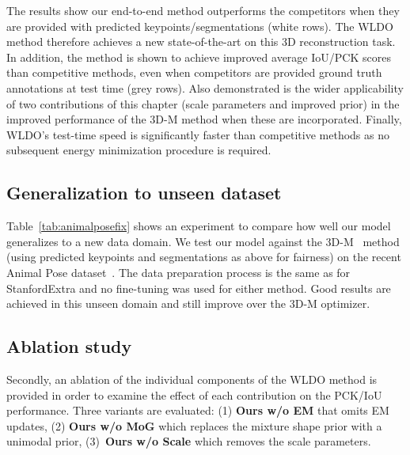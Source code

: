The results show our end-to-end method outperforms the competitors when they are provided with predicted keypoints/segmentations (white rows). The WLDO method therefore achieves a new state-of-the-art on this 3D reconstruction task. In addition, the method is shown to achieve improved average IoU/PCK scores than competitive methods, even when competitors are provided ground truth annotations at test time (grey rows). Also demonstrated is the wider applicability of two contributions of this chapter (scale parameters and improved prior) in the improved performance of the 3D-M method when these are incorporated. Finally, WLDO's test-time speed is significantly faster than competitive methods as no subsequent energy minimization procedure is required. 







\subsection{Generalization to unseen dataset}

Table~\ref{tab:animalposefix} shows an experiment to compare how well our model generalizes to a new data domain. We test our model against the 3D-M~\cite{zuffi2017menagerie} method (using predicted keypoints and segmentations as above for fairness) on the recent Animal Pose dataset~\cite{animalpose}. The data preparation process is the same as for StanfordExtra and no fine-tuning was used for either method. Good results are achieved in this unseen domain and still improve over the 3D-M optimizer.




\subsection{Ablation study}

Secondly, an ablation of the individual components of the WLDO method is provided in order to examine the effect of each contribution on the PCK/IoU performance. Three variants are evaluated: (1) \textbf{Ours w/o EM} that omits EM updates, (2) \textbf{Ours w/o MoG} which replaces the mixture shape prior with a unimodal prior, (3)~\textbf{Ours w/o Scale} which removes the scale parameters. 


